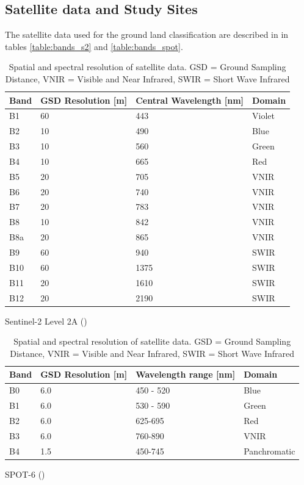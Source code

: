 \documentclass[10pt]{article}
\begin{document}
\subsection{Satellite data and Study Sites}
The satellite data used for the ground land classification are described in in tables \ref{table:bands_s2} and \ref{table:bands_spot}.
\begin{table}[H]
    \centering
    \begin{subtable}{.52\textwidth}
        \centering
        \begin{tabular}{@{}lp{2cm}p{2.2cm}l@{}}\toprule
            Band & GSD Resolution [m] & Central Wavelength [nm] & Domain \\\hline
            B1 & 60 & 443 & Violet \\
            B2 & 10 & 490 & Blue \\
            B3 & 10 & 560 & Green \\
            B4 & 10 & 665 & Red \\
            B5 & 20 & 705 & VNIR \\
            B6 & 20 & 740 & VNIR \\
            B7 & 20 & 783 & VNIR \\
            B8 & 10 & 842 & VNIR \\
            B8a & 20 & 865 & VNIR \\
            B9 & 60 & 940 & SWIR \\
            B10 & 60 & 1375 & SWIR \\
            B11 & 20 & 1610 & SWIR \\
            B12 & 20 & 2190 & SWIR\\\bottomrule
        \end{tabular}
        \caption{Sentinel-2 Level 2A (\cite{esa-s2res,theia})}
        \label{table:bands_s2}
    \end{subtable}
    \begin{subtable}{.45\textwidth}
        \centering
        \begin{tabular}{@{}lp{1.7cm}p{2.1cm}l@{}}\toprule
            Band & GSD Resolution [m] & Wavelength range [nm] & Domain \\\hline
            B0 & 6.0 & 450 - 520 & Blue \\
            B1 & 6.0 & 530 - 590 & Green \\
            B2 & 6.0 & 625-695 & Red \\
            B3 & 6.0 & 760-890 & VNIR \\
            B4 & 1.5 & 450-745 & Panchromatic \\\bottomrule
        \end{tabular}
        \caption{SPOT-6 (\cite{SPOT6_technical-sheet})}
        \label{table:bands_spot}
    \end{subtable}
    \caption{Spatial and spectral resolution of satellite data. GSD = Ground Sampling Distance, VNIR = Visible and Near Infrared, SWIR = Short Wave Infrared}
    \label{table:bands}
\end{table}
\end{document}
